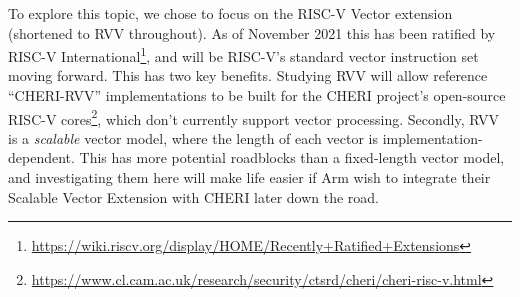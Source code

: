 \documentclass[../thesis]{subfiles}
\begin{document}
To explore this topic, we chose to focus on the RISC-V Vector extension\cite{specification-RVV-v1.0} (shortened to RVV throughout).
As of November 2021 this has been ratified by RISC-V International\footnote{\url{https://wiki.riscv.org/display/HOME/Recently+Ratified+Extensions}}, and will be RISC-V's standard vector instruction set moving forward.
This has two key benefits.
Studying RVV will allow reference \enquote{CHERI-RVV} implementations to be built for the CHERI project's open-source RISC-V cores\footnote{\url{https://www.cl.cam.ac.uk/research/security/ctsrd/cheri/cheri-risc-v.html}}, which don't currently support vector processing.
Secondly, RVV is a \emph{scalable} vector model, where the length of each vector is implementation-dependent.
This has more potential roadblocks than a fixed-length vector model, and investigating them here will make life easier if Arm wish to integrate their Scalable Vector Extension with CHERI later down the road.



\end{document}
